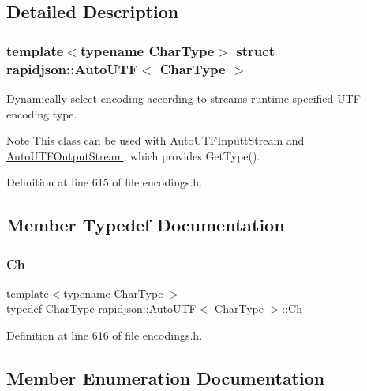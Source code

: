 \subsection{Detailed Description}
\subsubsection*{template$<$typename Char\+Type$>$\newline
struct rapidjson\+::\+Auto\+U\+T\+F$<$ Char\+Type $>$}

Dynamically select encoding according to stream\textquotesingle{}s runtime-\/specified U\+TF encoding type. 

\begin{DoxyNote}{Note}
This class can be used with Auto\+U\+T\+F\+Inputt\+Stream and \mbox{\hyperlink{classrapidjson_1_1_auto_u_t_f_output_stream}{Auto\+U\+T\+F\+Output\+Stream}}, which provides Get\+Type(). 
\end{DoxyNote}


Definition at line 615 of file encodings.\+h.



\subsection{Member Typedef Documentation}
\mbox{\label{structrapidjson_1_1_auto_u_t_f_a8ba58f529fad9b33dc419b12ee13844d}} 
\subsubsection{\texorpdfstring{Ch}{Ch}}
{\footnotesize\ttfamily template$<$typename Char\+Type $>$ \\
typedef Char\+Type \mbox{\hyperlink{structrapidjson_1_1_auto_u_t_f}{rapidjson\+::\+Auto\+U\+TF}}$<$ Char\+Type $>$\+::\mbox{\hyperlink{structrapidjson_1_1_auto_u_t_f_a8ba58f529fad9b33dc419b12ee13844d}{Ch}}}



Definition at line 616 of file encodings.\+h.



\subsection{Member Enumeration Documentation}
\mbox{\label{structrapidjson_1_1_auto_u_t_f_aa9095b9e85767361f9a0ae5527dba101}} 
